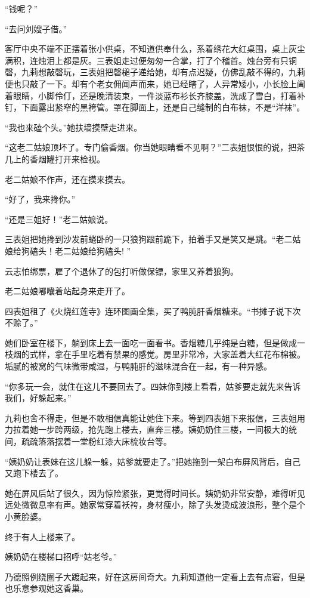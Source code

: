 \par “钱呢？”
\par “去问刘嫂子借。”
\par 客厅中央不端不正摆着张小供桌，不知道供奉什么，系着绣花大红桌围，桌上灰尘满积，连烛泪上都是灰。三表姐走过便匆匆一合掌，打了个稽首。烛台旁有只铜磬，九莉想敲磬玩，三表姐把磬槌子递给她，却有点迟疑，仿佛乱敲不得的，九莉便也只敲了一下。却有个老女佣闻声而来，她已经瞎了，人异常矮小，小长脸上阖着眼睛，小脚伶仃，还是晚清装束，一件淡蓝布衫长齐膝盖，洗成了雪白，打着补钉，下面露出紧窄的黑袴管。罩在脚面上，还是自己缝制的白布袜，不是“洋袜”。
\par “我也来磕个头。”她扶墙摸壁走进来。
\par “这老二姑娘顶坏了。专门偷香烟。你当她眼睛看不见啊？”二表姐恨恨的说，把茶几上的香烟罐打开来检视。
\par 老二姑娘不作声，还在摸来摸去。
\par “好了，我来搀你。”
\par “还是三姐好！”老二姑娘说。
\par 三表姐把她搀到沙发前蜷卧的一只狼狗跟前跪下，拍着手又是笑又是跳。“老二姑娘给狗磕头！老二姑娘给狗磕头! ”
\par 云志怕绑票，雇了个退休了的包打听做保镖，家里又养着狼狗。
\par 老二姑娘嘟囔着站起身来走开了。
\par 四表姐租了《火烧红莲寺》连环图画全集，买了鸭肫肝香烟糖来。“书摊子说下次不赊了。”
\par 她们卧室在楼下，躺到床上去一面吃一面看书。香烟糖几乎纯是白糖，但是做成一枝烟的式样，拿在手里吃着有禁果的感觉。房里非常冷，大家盖着大红花布棉被。垢腻的被窝的气味微带咸湿，与鸭肫肝的滋味混合在一起，有一种异感。
\par “你多玩一会，就住在这儿不要回去了。四妹你到楼上看看，姑爹要走就先来告诉我们，好躲起来。”
\par 九莉也舍不得走，但是不敢相信真能让她住下来。等到四表姐下来报信，三表姐用力拉着她一步跨两级，抢先跑上楼去，直奔三楼。姨奶奶住三楼，一间极大的统间，疏疏落落摆着一堂粉红漆大床梳妆台等。
\par “姨奶奶让表妹在这儿躲一躲，姑爹就要走了。”把她拖到一架白布屏风背后，自己又跑下楼去了。
\par 她在屏风后站了很久，因为惊险紧张，更觉得时间长。姨奶奶非常安静，难得听见远处微微息率有声。她家常穿着袄袴，身材瘦小，除了头发烫成波浪形，整个是个小黄脸婆。
\par 终于有人上楼来了。
\par 姨奶奶在楼梯口招呼“姑老爷。”
\par 乃德照例绕圈子大踱起来，好在这房间奇大。九莉知道他一定看上去有点窘，但是也乐意参观她这香巢。
